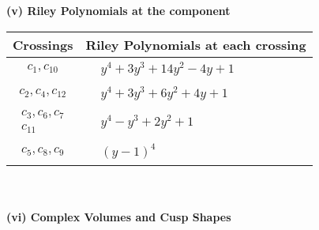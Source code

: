 \documentclass[1p]{elsarticle_modified}
\theoremstyle{definition}
\begin{document}
\newpage\renewcommand{\arraystretch}{1}
\flushleft \textbf{(v) Riley Polynomials at the component}\newline \\
\begin{tabular}{m{50pt}|m{274pt}}
Crossings & \hspace{64pt}Riley Polynomials at each crossing \\
\hline $$\begin{aligned}c_{1},c_{10}\end{aligned}$$&$\begin{aligned}
&y^4+3 y^3+14 y^2-4 y+1
\end{aligned}$\\
\hline $$\begin{aligned}c_{2},c_{4},c_{12}\end{aligned}$$&$\begin{aligned}
&y^4+3 y^3+6 y^2+4 y+1
\end{aligned}$\\
\hline $$\begin{aligned}c_{3},c_{6},c_{7}\\c_{11}\end{aligned}$$&$\begin{aligned}
&y^4- y^3+2 y^2+1
\end{aligned}$\\
\hline $$\begin{aligned}c_{5},c_{8},c_{9}\end{aligned}$$&$\begin{aligned}
&(y-1)^4
\end{aligned}$\\
\hline
\end{tabular}\\~\\
\newpage\flushleft \textbf{(vi) Complex Volumes and Cusp Shapes}
\end{document}
